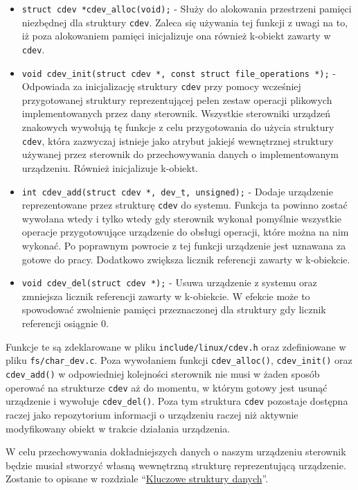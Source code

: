 \begin{itemize}
\item
  \texttt{struct cdev *cdev\_alloc(void);} - Służy do alokowania
  przestrzeni pamięci niezbędnej dla struktury \texttt{cdev}. Zaleca się
  używania tej funkcji z uwagi na to, iż poza alokowaniem pamięci
  inicjalizuje ona również k-obiekt zawarty w \texttt{cdev}.
\item
  \texttt{void cdev\_init(struct cdev *, const struct file\_operations *);}
  - Odpowiada za inicjalizację struktury \texttt{cdev} przy pomocy
  wcześniej przygotowanej struktury reprezentującej pełen zestaw
  operacji plikowych implementowanych przez dany sterownik. Wszystkie
  sterowniki urządzeń znakowych wywołują tę funkcje z celu przygotowania
  do użycia struktury \texttt{cdev}, która zazwyczaj istnieje jako
  atrybut jakiejś wewnętrznej struktury używanej przez sterownik do
  przechowywania danych o implementowanym urządzeniu. Również
  inicjalizuje k-obiekt.
\item
  \texttt{int cdev\_add(struct cdev *, dev\_t, unsigned);} - Dodaje
  urządzenie reprezentowane przez strukturę \texttt{cdev} do systemu.
  Funkcja ta powinno zostać wywołana wtedy i tylko wtedy gdy sterownik
  wykonał pomyślnie wszystkie operacje przygotowujące urządzenie do
  obsługi operacji, które można na nim wykonać. Po poprawnym powrocie z
  tej funkcji urządzenie jest uznawana za gotowe do pracy. Dodatkowo
  zwiększa licznik referencji zawarty w k-obiekcie.
\item
  \texttt{void cdev\_del(struct cdev *);} - Usuwa urządzenie z systemu
  oraz zmniejsza licznik referencji zawarty w k-obiekcie. W efekcie może
  to spowodować zwolnienie pamięci przeznaczonej dla struktury gdy
  licznik referencji osiągnie 0.
\end{itemize}

Funkcje te są zdeklarowane w pliku \texttt{include/linux/cdev.h} oraz
zdefiniowane w pliku \texttt{fs/char\_dev.c}. Poza wywołaniem funkcji
\texttt{cdev\_alloc()}, \texttt{cdev\_init()} oraz \texttt{cdev\_add()}
w odpowiedniej kolejności sterownik nie musi w żaden sposób operować na
strukturze \texttt{cdev} aż do momentu, w którym gotowy jest usunąć
urządzenie i wywołuje \texttt{cdev\_del()}. Poza tym struktura
\texttt{cdev} pozostaje dostępna raczej jako repozytorium informacji o
urządzeniu raczej niż aktywnie modyfikowany obiekt w trakcie działania
urządzenia.

W celu przechowywania dokładniejszych danych o naszym urządzeniu
sterownik będzie musiał stworzyć własną wewnętrzną strukturę
reprezentującą urządzenie. Zostanie to opisane w rozdziale
``\hyperref[kluczowe-struktury-danych]{Kluczowe struktury danych}''.

